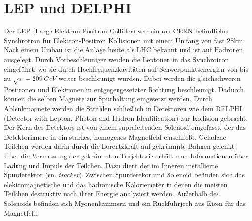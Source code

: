 \documentclass{include/thesisclass3}
\newcommand{\e}[1]{\,\si{#1}}
\begin{document}
\section{LEP und DELPHI}
Der LEP (Large Elektron-Positron-Collider) war ein am CERN befindliches Synchrotron für Elektron-Positron Kollisionen mit einem Umfang von fast 28km. Nach einem Umbau ist die Anlage heute als LHC bekannt und ist auf Hadronen ausgelegt. Durch Vorbeschleuniger werden die Leptonen in das Synchrotron eingeführt, wo sie durch Hochfrequenzkavitäten auf Schwerpunktsenergien von bis zu $\sqrt{s}=209\e{GeV}$ weiter beschleunigt wurden. Dabei werden die gleichschweren Positronen und Elektronen in entgegengesetzter Richtung beschleunigt. Dadurch können die selben Magnete zur Spurhaltung eingesetzt werden. Durch Ablenkmagnete werden die Strahlen schließlich in Detektoren wie dem DELPHI (Detector with Lepton, Photon and Hadron Identification) zur Kollision gebracht. 
Der Kern des Detektors ist von einem supraleitenden Solenoid eingefasst, der das Detektorinnere in ein starkes, homogenes Magnetfeld einschließt. 
Geladene Teilchen werden darin durch die Lorentzkraft auf gekrümmte Bahnen gelenkt. 
Über die Vermessung der gekrümmten Trajektorie erhält man Informationen über Ladung und Impuls der Teilchen. 
Dazu dient der im Inneren installierte Spurdetektor (en. \textit{tracker}). 
Zwischen Spurdetekor und Solenoid befinden sich das elektromagnetische und das hadronische Kaloriemeter in denen die meisten Teilchen destruktiv nach ihrer Energie analysiert werden. 
Außerhalb des Solenoids befinden sich Myonenkammern und ein Rückführjoch aus Eisen für das Magnetfeld. 
\end{document}
